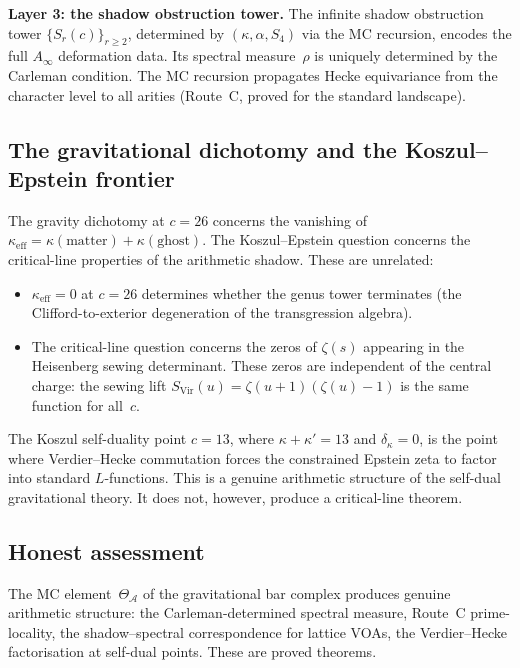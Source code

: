 \documentclass[11pt]{article}
\newcommand{\cA}{\mathcal{A}}
\begin{document}
\textbf{Layer 3: the shadow obstruction tower.}
The infinite shadow obstruction tower $\{S_r(c)\}_{r \ge 2}$, determined by
$(\kappa, \alpha, S_4)$ via the MC recursion, encodes the full
$A_\infty$ deformation data.  Its spectral measure~$\rho$ is
uniquely determined by the Carleman condition.  The MC recursion
propagates Hecke equivariance from the character level to all
arities (Route~C, proved for the standard landscape).

\subsection{The gravitational dichotomy and the Koszul--Epstein frontier}

The gravity dichotomy at $c = 26$ concerns the vanishing of
$\kappa_{\mathrm{eff}} = \kappa(\mathrm{matter})
+ \kappa(\mathrm{ghost})$.  The Koszul--Epstein question
concerns the critical-line properties of the arithmetic
shadow.  These are unrelated:

\begin{itemize}
\item $\kappa_{\mathrm{eff}} = 0$ at $c = 26$ determines whether
  the genus tower terminates (the Clifford-to-exterior
  degeneration of the transgression algebra).

\item The critical-line question concerns the zeros of
  $\zeta(s)$ appearing in the Heisenberg sewing determinant.
  These zeros are independent of the central charge: the sewing
  lift $S_{\mathrm{Vir}}(u) = \zeta(u+1)(\zeta(u) - 1)$ is the
  same function for all~$c$.
\end{itemize}

The Koszul self-duality point $c = 13$, where
$\kappa + \kappa' = 13$ and $\delta_\kappa = 0$, is the point
where Verdier--Hecke commutation forces the constrained Epstein
zeta to factor into standard $L$-functions.  This is a genuine
arithmetic structure of the self-dual gravitational theory.
It does not, however, produce a critical-line theorem.

\subsection{Honest assessment}

The MC element~$\Theta_\cA$ of the gravitational bar complex
produces genuine arithmetic structure: the Carleman-determined
spectral measure, Route~C prime-locality, the shadow--spectral
correspondence for lattice VOAs, the Verdier--Hecke factorisation
at self-dual points.  These are proved theorems.
\end{document}
